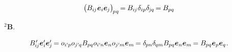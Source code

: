 
\nopagebreak\vspace{-0.25em}\begin{equation*}
\bigl( B_{i\hspace{-0.1ex}j} \hspace{.1ex} \bm{e}_i \bm{e}_{\hspace{-0.1ex}j} \bigr)_{\hspace{-0.2ex}p\hspace{.1ex}q} \hspace{-0.3ex}
= \hspace{-0.1ex} B_{i\hspace{-0.1ex}j} \hspace{.1ex} \delta_{ip} \delta_{\hspace{-0.15ex}j\hspace{-0.1ex}q} \hspace{-0.2ex}
= \hspace{-0.1ex} B_{pq}
\end{equation*}

\vspace{-0.25em}\noindent
{} ~${^2\!\bm{B}}$.
 

\nopagebreak\vspace{-0.25em}\begin{equation*}
\scalebox{0.99}{$
B\hspace{.16ex}'_{\hspace{-0.32ex}i\hspace{-0.1ex}j} \bm{e}'_{i} \bm{e}'_{\hspace{-0.1ex}j} \hspace{-0.2ex}
= \cosinematrix{i'\hspace{-0.1ex}p} \cosinematrix{j'\hspace{-0.1ex}q} B_{pq} \cosinematrix{i'\hspace{-0.1ex}n} \bm{e}_n \cosinematrix{j'\hspace{-0.1ex}m} \bm{e}_m \hspace{-0.2ex}
= \delta_{\hspace{-0.1ex}pn} \delta_{\hspace{-0.1ex}qm} B_{pq} \bm{e}_n \bm{e}_m \hspace{-0.2ex}
= B_{pq} \bm{e}_p \bm{e}_q
$}
\hspace{.1ex} .
\end{equation*}


